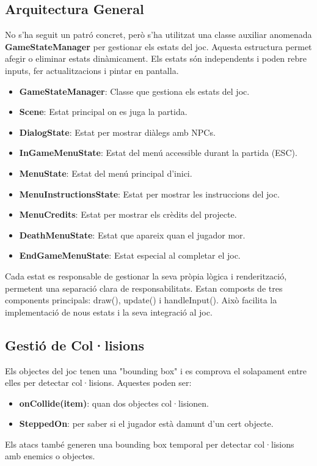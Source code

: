 \documentclass[a4paper,12pt]{article}
\begin{document}
\subsection{Arquitectura General}
No s'ha seguit un patró concret, però s'ha utilitzat una classe auxiliar anomenada \textbf{GameStateManager} per gestionar els estats del joc. Aquesta estructura permet afegir o eliminar estats dinàmicament. Els estats són independents i poden rebre inputs, fer actualitzacions i pintar en pantalla.

\begin{itemize}
    \item \textbf{GameStateManager}: Classe que gestiona els estats del joc.
    \item \textbf{Scene}: Estat principal on es juga la partida.
    \item \textbf{DialogState}: Estat per mostrar diàlegs amb NPCs.
    \item \textbf{InGameMenuState}: Estat del menú accessible durant la partida (ESC).
    \item \textbf{MenuState}: Estat del menú principal d'inici.
    \item \textbf{MenuInstructionsState}: Estat per mostrar les instruccions del joc.
    \item \textbf{MenuCredits}: Estat per mostrar els crèdits del projecte.
    \item \textbf{DeathMenuState}: Estat que apareix quan el jugador mor.
    \item \textbf{EndGameMenuState}: Estat especial al completar el joc.
\end{itemize}

Cada estat es responsable de gestionar la seva pròpia lògica i renderització, permetent una separació clara de responsabilitats. Estan composts de tres components principals: draw(), update() i handleInput(). Això facilita la implementació de nous estats i la seva integració al joc.

\subsection{Gestió de Col·lisions}
Els objectes del joc tenen una "bounding box" i es comprova el solapament entre elles per detectar col·lisions. Aquestes poden ser:
\begin{itemize}
    \item \textbf{onCollide(item)}: quan dos objectes col·lisionen.
    \item \textbf{SteppedOn}: per saber si el jugador està damunt d'un cert objecte.
\end{itemize}
Els atacs també generen una bounding box temporal per detectar col·lisions amb enemics o objectes.
\end{document}
